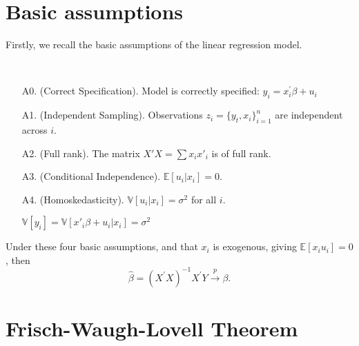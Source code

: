 \section{Basic assumptions}
\label{sec:basic-assumptions}

Firstly, we recall the basic assumptions of the linear regression model.
\begin{assumption}
    \

    \begin{enumerate}
        \item[A0.](Correct Specification). Model is correctly specified: $y_i = x_i^{\prime} \beta + u_i$

        \item[A1.](Independent Sampling). Observations $z_i = \{ y_t, x_i \}_{i = 1}^n$ are independent across $i$.
          
        \item[A2.](Full rank). The matrix $X'X = \sum x_i x'_i$ is of full rank.

        \item[A3.](Conditional Independence). $\mathbb{E}[u_i | x_i] = 0$.
          
        \item[A4.](Homoskedasticity). $\mathbb{V}[u_i | x_i] = \sigma^2$ for all $i$.
        
        $\mathbb{V}[y_i] = \mathbb{V}[x'_i \beta + u_i | x_i] = \sigma^2$
    \end{enumerate}
\end{assumption}

Under these four basic assumptions, and that $x_i$ is exogenous, giving $\mathbb{E}[x_i u_i] = 0$, then
\[
\hat{\beta} = (X^{\prime} X)^{-1}X^{\prime} Y \overset{p}{\to} \beta.
\]

\section{Frisch-Waugh-Lovell Theorem}\label{sec:FWL}

